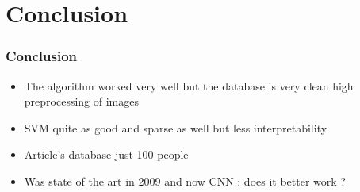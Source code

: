 \documentclass{beamer}
\begin{document}
\section{Conclusion}


\begin{frame}

		\frametitle{Conclusion}
		
		\begin{itemize}
		\item The algorithm worked very well but the database is very clean high preprocessing of images
		\item SVM quite as good and sparse as well but less interpretability
		\item Article's database just 100 people
		\item Was state of the art in 2009 and now CNN : does it better work ?	
		\end{itemize}
		
		
\end{frame}

\end{document}
